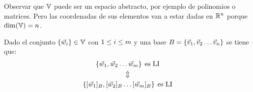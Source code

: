 Observar que $\mathbb{V}$ puede ser un espacio abstracto, por ejemplo de polinomios o matrices.
Pero las coordenadas de sus elementos van a estar dadas en $\mathbb{R}^n$ porque $\operatorname{dim}(\mathbb{V})=n$.

\begin{mdframed}[style=PropertyFrame]
    \begin{prop}
    \end{prop}
    Dado el conjunto ${ \left\{ {\Vec{w}_i} \right\} } \in \mathbb{V}$ con $1\leq i\leq m$ y una base $B={ \left\{ {\Vec{v}_1,\Vec{v}_2 \dots \Vec{v}_n} \right\} }$ se tiene que:
    \begin{gather*}
        { \left\{ {\Vec{w}_1,\Vec{w}_2 \dots \Vec{w}_m} \right\} } \hspace{1ex} \textrm{es LI}
        \\
        \Updownarrow
        \\
        { \left\{ {[\Vec{w}_1]_B , [\Vec{w}_2]_B \dots [\Vec{w}_m]_B} \right\} } \hspace{1ex} \textrm{es LI}
    \end{gather*}
\end{mdframed}


